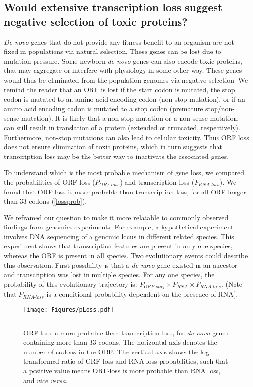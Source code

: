 \documentclass[12pt,a4paper]{article}
\begin{document}
\subsection{Would extensive transcription loss suggest negative selection of toxic proteins?}


\textit{De novo} genes that do not provide any fitness benefit to an organism are not fixed in populations via natural selection. These genes can be lost due to mutation pressure. Some newborn \textit{de novo} genes can also encode toxic proteins, that may aggregate or interfere with physiology in some other way. These genes would thus be eliminated from the population genomes via negative selection. We remind the reader that an ORF is lost if the start codon is mutated, the stop codon is mutated to an amino acid encoding codon (non-stop mutation), or if an amino acid encoding codon is mutated to a stop codon (premature stop/non-sense mutation). It is likely that a non-stop mutation or a non-sense mutation, can still result in translation of a protein (extended or truncated, respectively). Furthermore, non-stop mutations can also lead to cellular toxicity. Thus ORF loss does not ensure elimination of toxic proteins, which in turn suggests that transcription loss may be the better way to inactivate the associated genes.

To understand which is the most probable mechanism of gene loss, we compared the probabilities of ORF loss ($P_\textit{ORF-loss}$) and transcription loss ($P_\textit{RNA-loss}$). We found that ORF loss is more probable than transcription loss, for all ORF longer than 33 codons (\autoref{lossprob}).

We reframed our question to make it more relatable to commonly observed findings from genomics experiments. For example, a hypothetical experiment involves DNA sequencing of a genomic locus in different related species. This experiment shows that transcription features are present in only one species, whereas the ORF is present in all species. Two evolutionary events could describe this observation. First possibility is that a \textit{de novo} gene existed in an ancestor and transcription was lost in multiple species. For any one species, the probability of this evolutionary trajectory is: $P_\textit{ORF-stay}\times P_\textit{RNA} \times P_\textit{RNA-loss}$. (Note that $P_\textit{RNA-loss}$ is a conditional probability dependent on the presence of RNA).

\begin{figure}[!t]
\centering
\texttt{[image: Figures/pLoss.pdf]}
\caption{ORF loss is more probable than transcription loss, for \textit{de novo} genes containing more than 33 codons. The horizontal axis denotes the number of codons in the ORF. The vertical axis shows the log transformed ratio of ORF loss and RNA loss probabilities, such that a positive value means ORF-loss is more probable than RNA loss, and \textit{vice versa}.}
\label{lossprob}

\vspace{1ex}
\hrule
\end{figure}
\end{document}
